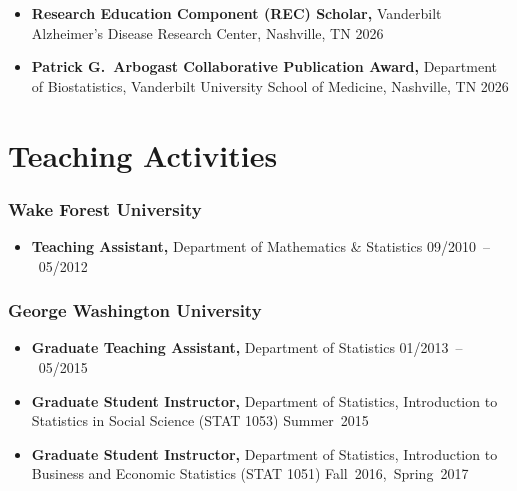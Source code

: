 \documentclass[12pt,letterpaper]{article}
\newenvironment{cventry}{\begin{minipage}[t]{\linewidth}}{\end{minipage}}
\begin{document}
\begin{itemize}
\begin{cventry} {\bf Elected Member,}
		\href{https://isi-web.org/}{International Statistical 
		Institute} \hfill 2026
		\par\end{cventry}
		\item\begin{cventry} {\bf Research Education Component (REC) 
		Scholar,} Vanderbilt Alzheimer's Disease Research Center, 
		Nashville, TN \hfill 2026
		\par\end{cventry}
		\item\begin{cventry} {\bf Patrick G.\ Arbogast Collaborative 
		Publication Award,} Department of Biostatistics, Vanderbilt 
		University School of Medicine, Nashville, TN \hfill 2026
		\par\end{cventry}
	\end{itemize}
	
	\section*{Teaching Activities}
	
	\subsubsection*{Wake Forest University}
	\begin{itemize}
		\item\begin{cventry} {\bf Teaching Assistant,} Department of 
		Mathematics \& Statistics \hfill \mbox{09/2010 -- 05/2012}
	\par\end{cventry}
	\end{itemize}
	
	\subsubsection*{George Washington University}
	\begin{itemize}
		\item\begin{cventry} {\bf Graduate Teaching Assistant,} 
		Department of Statistics \hfill \mbox{01/2013 -- 05/2015}
		\par\end{cventry}
		\item\begin{cventry} {\bf Graduate Student Instructor,} Department of Statistics, 
		Introduction to Statistics in Social Science (STAT 1053) \hfill 
		\mbox{Summer 2015}
		\par\end{cventry}
		\item\begin{cventry} {\bf Graduate Student Instructor,} Department of Statistics, 
		Introduction to Business and Economic Statistics (STAT 1051) \hfill 
		\mbox{Fall 2016, Spring 2017}
		\par\end{cventry}
	\end{itemize}
	
\end{document}
